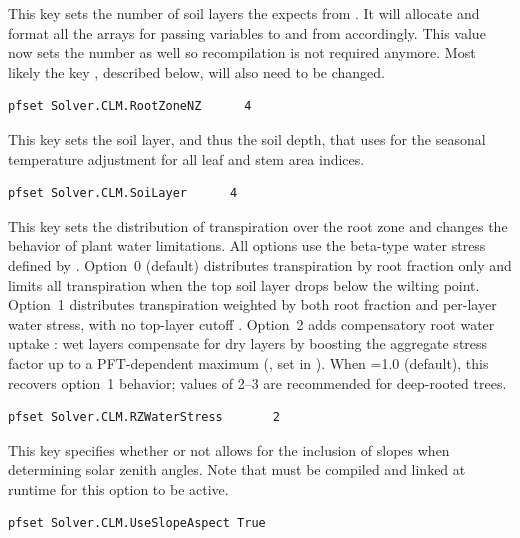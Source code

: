 {This key sets the number of soil layers the \parflow{} expects from
  .  It will allocate and format all the arrays for passing
  variables to and from  accordingly.  This value now sets
  the  number as well so recompilation is not required anymore.
  Most likely the key , described
  below, will also need to be changed.}
\begin{display}\begin{verbatim}
pfset Solver.CLM.RootZoneNZ      4
\end{verbatim}\end{display}

{This key sets the soil layer, and thus the soil depth, that  uses for the seasonal temperature adjustment for all leaf and stem area indices.}
\begin{display}\begin{verbatim}
pfset Solver.CLM.SoiLayer      4
\end{verbatim}\end{display}

{This key sets the distribution of transpiration over the root zone and changes the behavior of plant water limitations.  All options use the beta-type water stress defined by .  Option~0 (default) distributes transpiration by root fraction only and limits all transpiration when the top soil layer drops below the wilting point.  Option~1 distributes transpiration weighted by both root fraction and per-layer water stress, with no top-layer cutoff \cite{Ferg16}.  Option~2 adds compensatory root water uptake \cite{Li2001}: wet layers compensate for dry layers by boosting the aggregate stress factor  up to a PFT-dependent maximum (, set in ).  When =1.0 (default), this recovers option~1 behavior; values of 2--3 are recommended for deep-rooted trees.}
\begin{display}\begin{verbatim}
pfset Solver.CLM.RZWaterStress       2
\end{verbatim}\end{display}

{This key specifies whether or not  allows for the inclusion of slopes when determining solar zenith angles.
 Note that  must be compiled and linked at runtime for this option to be active.
}
\begin{display}\begin{verbatim}
pfset Solver.CLM.UseSlopeAspect True
\end{verbatim}\end{display}

